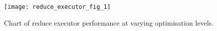 \begin{figure}[htb]
    \centering
    \texttt{[image: reduce\_executor\_fig\_1]}
    \caption{Chart of reduce executor performance at varying optimisation levels.}
    \label{fig:reduce_executor_performance_on_count}
\end{figure}
